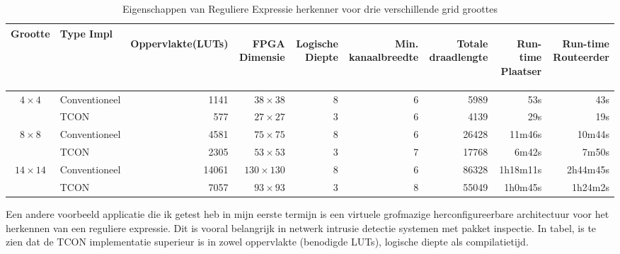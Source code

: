 \documentclass[a4paper,oneside,12pt]{article}
\begin{document}
\renewcommand{\arraystretch}{1.2} 
\renewcommand{\tabcolsep}{0.17cm} 
\begin{table}[t]
\caption{Eigenschappen van Reguliere Expressie herkenner voor drie verschillende grid groottes} %
\label{tbl:expressionmatcher}
\begin{tabular}{clrrrrrrr}
\textbf{Grootte}&\textbf{Type Impl}&\begin{sideways}Oppervlakte(LUTs)\end{sideways}&\begin{sideways}FPGA Dimensie\end{sideways}&\begin{sideways}Logische Diepte\end{sideways}&\begin{sideways}Min. kanaalbreedte\end{sideways}&\begin{sideways}Totale draadlengte\end{sideways}&\begin{sideways}Run-time Plaatser\end{sideways}&\begin{sideways}Run-time Routeerder\end{sideways}\\
\hline
\hline
\multirow{2}{*}{$4\times4$} 	&Conventioneel	&1141		&$38\times38$		&8 	&6		&5989		&53s		&43s\\
							&TCON			&577 		&$27\times27$		&3	&6		&4139		&29s		&19s\\
\hline
\multirow{2}{*}{$8\times8$} 	&Conventioneel	&4581		&$75\times75$		&8	&6		&26428		&11m46s	&10m44s\\
							&TCON			&2305 		&$53\times53$		&3	&7		&17768		&6m42s		&7m50s\\
\hline
\multirow{2}{*}{$14\times14$} 	&Conventioneel	&14061		&$130\times130$	&8	&6		&86328		&1h18m11s	&2h44m45s\\
							&TCON			&7057 		&$93\times93$		&3	&8		&55049		&1h0m45s	&1h24m2s\\
\hline
\end{tabular}
\end{table}


Een andere voorbeeld applicatie die ik getest heb in mijn eerste termijn is een virtuele grofmazige herconfigureerbare architectuur voor het herkennen van een reguliere expressie. Dit is vooral belangrijk in netwerk intrusie detectie systemen met pakket inspectie. In tabel, is te zien dat de TCON implementatie superieur is in zowel oppervlakte (benodigde LUTs), logische diepte als compilatietijd. 
\end{document}
